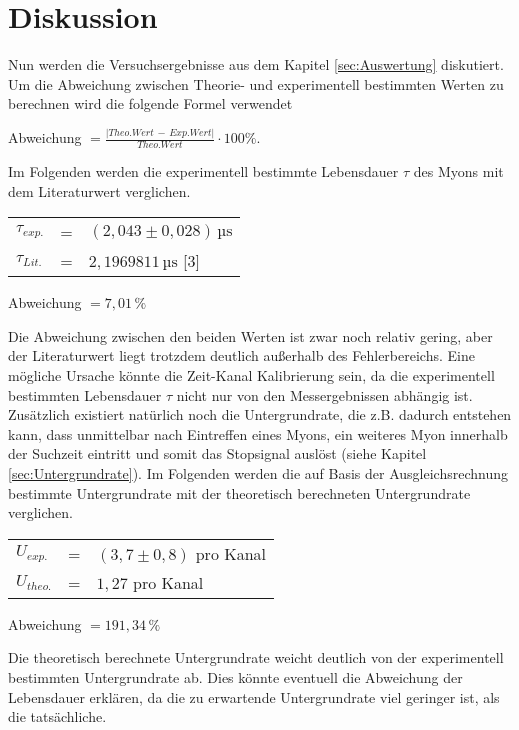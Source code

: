\section{Diskussion}
\label{sec:Diskussion}
\noindent Nun werden die Versuchsergebnisse aus dem Kapitel \ref{sec:Auswertung} diskutiert. Um die Abweichung zwischen Theorie- und experimentell bestimmten Werten zu berechnen wird die folgende Formel verwendet
\begin{center}
Abweichung $ = \frac{|Theo.Wert\,-\,Exp.Wert|}{Theo.Wert}\cdot 100\%$. 
\end{center}

\noindent Im Folgenden werden die experimentell bestimmte Lebensdauer $\tau$ des Myons mit dem Literaturwert verglichen. 

\begin{table}[H]
\centering
\begin{tabular}{lll}
$\tau_{exp.}$   &=& $(2,043\pm0,028)\,\mathrm{µs}$ \\
$\tau_{Lit.}$   &=& $ 2,1969811\,\mathrm{µs} $ [3]\\
\end{tabular}
\end{table}

\begin{center}
Abweichung $=7,01\,\%$
\end{center}

\noindent Die Abweichung zwischen den beiden Werten ist zwar noch relativ gering, aber der Literaturwert liegt trotzdem deutlich außerhalb des Fehlerbereichs. Eine mögliche Ursache könnte die Zeit-Kanal Kalibrierung sein, da die experimentell bestimmten Lebensdauer $\tau$ nicht nur von den Messergebnissen abhängig ist. Zusätzlich existiert natürlich noch die Untergrundrate, die z.B. dadurch entstehen kann, dass unmittelbar nach Eintreffen eines Myons, ein weiteres Myon innerhalb der Suchzeit eintritt und somit das Stopsignal auslöst (siehe Kapitel \ref{sec:Untergrundrate}). Im Folgenden werden die auf Basis der Ausgleichsrechnung bestimmte Untergrundrate mit der theoretisch berechneten Untergrundrate verglichen.

\begin{table}[H]
\centering
\begin{tabular}{lll}
$U_{exp.}$    &=& $(3,7\pm0,8)$ pro Kanal\\
$U_{theo.}$   &=& $1,27$ pro Kanal\\
\end{tabular}
\end{table}

\begin{center}
Abweichung $=191,34\,\%$
\end{center}

\noindent Die theoretisch berechnete Untergrundrate weicht deutlich von der experimentell bestimmten Untergrundrate ab. Dies könnte eventuell die Abweichung der Lebensdauer erklären, da die zu erwartende Untergrundrate viel geringer ist, als die tatsächliche.